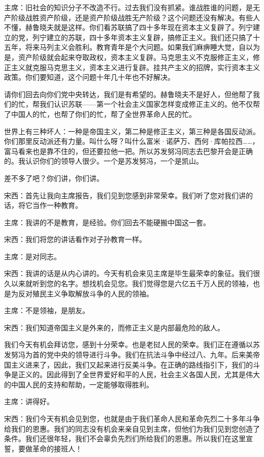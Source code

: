 主席：旧社会的知识分子不改造不行。过去我们没有抓紧。谁战胜谁的问题，是无产阶级战胜资产阶级，还是资产阶级战胜无产阶级？这个问题还没有解决。有些人不懂，赫鲁晓夫就是这样。你们看苏联搞了四十多年现在资本主义复辟了。列宁建立的党，列宁建立的苏联，四十多年资本主义复辟，搞修正主义。我们还只搞了十五年，将来马列主义会胜利。教育青年是个大问题。如果我们麻痹睡大觉，自以为是，资产阶级就会起来夺取政权，资本主义复辟。马克思主义不克服修正主义，修正主义就克服马克思主义，资本主义进行复辟。挂共产主义的招牌，实行资本主义政策。你们要知道，这个问题十年几十年也不好解决。

请你们回去向你们党中央转达，我们是有希望的。赫鲁晓夫不是好人，但他帮了我们的忙，帮我们认识苏联——第一个社会主义国家怎样变成修正主义的。他不仅帮了中国人的忙，也帮了你们的忙，帮了全世界革命人民的忙。

世界上有三种坏人：一种是帝国主义，第二种是修正主义，第三种是各国反动派。你们那里反动派还有力量。叫什么呀？叫什么富米·诺萨万、西何·库帕拉西……，富马看来也是靠不住的，但还要拉他一把。所以苏发努冯同志去巴黎开会是正确的。我认识你们的领导人很少。一个是苏发努冯，一个是凯山。

差不多了吧？你们讲，你们讲。

宋西：首先让我向主席报告，我们见到您感到非常荣幸。我们听了您对我们讲的话，将它当作一种教育。

主席：我讲的不是教育，是经验。你们回去不能硬搬中国这一套。

宋西：我们将您的讲话看作对子孙教育一样。

主席：是对同志。

宋西：我讲的话是从内心讲的。今天有机会来见主席是毕生最荣幸的象征。我们很久以来就听到您的名字。想找机会见您。我们觉得您是六亿五千万人民的领袖，也是为反对殖民主义争取解放斗争的人民的领袖。

主席：不是领袖，是朋友。

宋西：我们知道帝国主义是外来的，而修正主义是内部最危险的敌人。

我们今天有机会拜访您，感到十分荣幸。也是老挝人民的荣幸。我们正在遵循以苏发努冯为首的党中央的领导进行斗争。我们在抗法斗争中经过八、九年。后来美帝国主义进来了，因此，我们又起来进行反美斗争。在正确的路线指引下，我们的斗争是正义的。因此得到了全世界爱好和平的人民，社会主义各国人民，尤其是伟大的中国人民的支持和帮助，一定能够取得胜利。

主席：讲得好。

宋西：我们今天有机会见到您，也就是由于我们革命人民和革命先烈二十多年斗争给我们的恩惠。我们的同志没有机会来亲自见到主席，但他们为我们见到您创造了条件。我们还很年轻，我们不会辜负先烈们所给我们的恩惠。所以我们在这里宣誓，要做革命的接班人！

